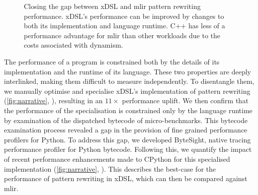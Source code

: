 \begin{figure}
    \centering
    \caption{Closing the gap between xDSL and \ac{mlir} pattern rewriting performance. xDSL's performance can be improved by changes to both its implementation and language runtime. C++ has less of a performance advantage for \ac{mlir} than other workloads due to the costs associated with dynamism.}
    \label{fig:narrative}
\end{figure}

The performance of a program is constrained both by the details of its implementation and the runtime of its language.
These two properties are deeply interlinked, making them difficult to measure independently.
To disentangle them, we manually optimise and specialise xDSL's implementation of pattern rewriting (\autoref{fig:narrative}, ), resulting in an $11\times$ performance uplift. %
We then confirm that the performance of the specialisation is constrained only by the language runtime by examination of the dispatched bytecode of micro-benchmarks.
This bytecode examination process revealed a gap in the provision of fine grained performance profilers for Python. To address this gap, we developed ByteSight, native tracing performance profiler for Python bytecode. %
Following this, we quantify the impact of recent performance enhancements made to CPython for this specialised implementation (\autoref{fig:narrative}, ). %
This describes the best-case for the performance of pattern rewriting in xDSL, which can then be compared against \ac{mlir}.


